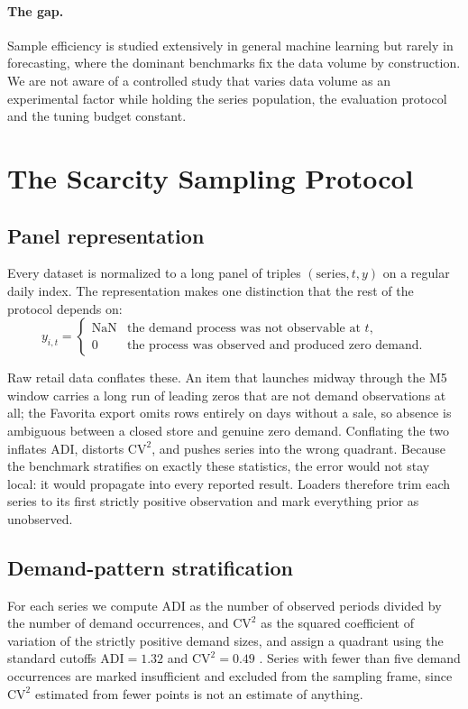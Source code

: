 \documentclass[11pt]{article}
\begin{document}
\paragraph{The gap.} Sample efficiency is studied extensively in general machine
learning but rarely in forecasting, where the dominant benchmarks fix the data
volume by construction. We are not aware of a controlled study that varies data
volume as an experimental factor while holding the series population, the
evaluation protocol and the tuning budget constant.

\section{The Scarcity Sampling Protocol}
\label{sec:protocol}

\subsection{Panel representation}

Every dataset is normalized to a long panel of triples
$(\text{series}, t, y)$ on a regular daily index. The representation makes one
distinction that the rest of the protocol depends on:
\[
y_{i,t} =
\begin{cases}
\text{NaN} & \text{the demand process was not observable at } t,\\
0 & \text{the process was observed and produced zero demand.}
\end{cases}
\]

Raw retail data conflates these. An item that launches midway through the M5
window carries a long run of leading zeros that are not demand observations at
all; the Favorita export omits rows entirely on days without a sale, so absence
is ambiguous between a closed store and genuine zero demand. Conflating the two
inflates ADI, distorts $\mathrm{CV}^2$, and pushes series into the wrong
quadrant. Because the benchmark stratifies on exactly these statistics, the error
would not stay local: it would propagate into every reported result. Loaders
therefore trim each series to its first strictly positive observation and mark
everything prior as unobserved.

\subsection{Demand-pattern stratification}

For each series we compute ADI as the number of observed periods divided by the
number of demand occurrences, and $\mathrm{CV}^2$ as the squared coefficient of
variation of the strictly positive demand sizes, and assign a quadrant using the
standard cutoffs $\mathrm{ADI} = 1.32$ and $\mathrm{CV}^2 = 0.49$
\citep{syntetos2005categorization}. Series with fewer than five demand
occurrences are marked insufficient and excluded from the sampling frame, since
$\mathrm{CV}^2$ estimated from fewer points is not an estimate of anything.
\end{document}
